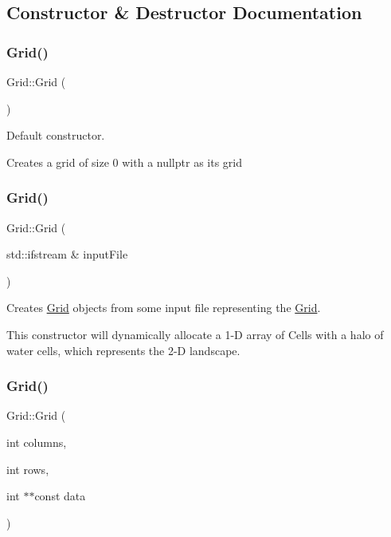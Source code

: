 \subsection{Constructor \& Destructor Documentation}
\mbox{\label{class_grid_a4ac9ff4f63552b4c61ff90fcb35ad66c}} 
\subsubsection{\texorpdfstring{Grid()}{Grid()}\hspace{0.1cm}{\footnotesize\ttfamily [1/5]}}
{\footnotesize\ttfamily Grid\+::\+Grid (\begin{DoxyParamCaption}{ }\end{DoxyParamCaption})}



Default constructor. 

Creates a grid of size 0 with a nullptr as its grid \mbox{\label{class_grid_a88ab1ccc8100827b4da40e62b7b77e96}} 
\subsubsection{\texorpdfstring{Grid()}{Grid()}\hspace{0.1cm}{\footnotesize\ttfamily [2/5]}}
{\footnotesize\ttfamily Grid\+::\+Grid (\begin{DoxyParamCaption}\item[{std\+::ifstream \&}]{input\+File }\end{DoxyParamCaption})}



Creates \hyperlink{class_grid}{Grid} objects from some input file representing the \hyperlink{class_grid}{Grid}. 

This constructor will dynamically allocate a 1-\/D array of Cells with a halo of water cells, which represents the 2-\/D landscape. \mbox{\label{class_grid_ab64f5607521a89e7a2fb99cbfa5f2b44}} 
\subsubsection{\texorpdfstring{Grid()}{Grid()}\hspace{0.1cm}{\footnotesize\ttfamily [3/5]}}
{\footnotesize\ttfamily Grid\+::\+Grid (\begin{DoxyParamCaption}\item[{int}]{columns,  }\item[{int}]{rows,  }\item[{int $\ast$$\ast$const}]{data }\end{DoxyParamCaption})}



